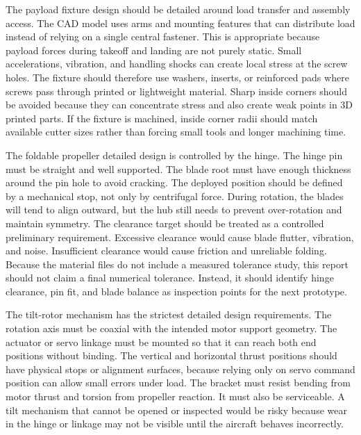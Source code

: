 The payload fixture design should be detailed around load transfer and assembly access. The CAD model uses arms and mounting features that can distribute load instead of relying on a single central fastener. This is appropriate because payload forces during takeoff and landing are not purely static. Small accelerations, vibration, and handling shocks can create local stress at the screw holes. The fixture should therefore use washers, inserts, or reinforced pads where screws pass through printed or lightweight material. Sharp inside corners should be avoided because they can concentrate stress and also create weak points in 3D printed parts. If the fixture is machined, inside corner radii should match available cutter sizes rather than forcing small tools and longer machining time.

The foldable propeller detailed design is controlled by the hinge. The hinge pin must be straight and well supported. The blade root must have enough thickness around the pin hole to avoid cracking. The deployed position should be defined by a mechanical stop, not only by centrifugal force. During rotation, the blades will tend to align outward, but the hub still needs to prevent over-rotation and maintain symmetry. The clearance target should be treated as a controlled preliminary requirement. Excessive clearance would cause blade flutter, vibration, and noise. Insufficient clearance would cause friction and unreliable folding. Because the material files do not include a measured tolerance study, this report should not claim a final numerical tolerance. Instead, it should identify hinge clearance, pin fit, and blade balance as inspection points for the next prototype.

The tilt-rotor mechanism has the strictest detailed design requirements. The rotation axis must be coaxial with the intended motor support geometry. The actuator or servo linkage must be mounted so that it can reach both end positions without binding. The vertical and horizontal thrust positions should have physical stops or alignment surfaces, because relying only on servo command position can allow small errors under load. The bracket must resist bending from motor thrust and torsion from propeller reaction. It must also be serviceable. A tilt mechanism that cannot be opened or inspected would be risky because wear in the hinge or linkage may not be visible until the aircraft behaves incorrectly.

